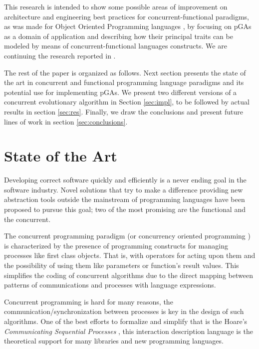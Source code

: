 \documentclass[sigconf]{acmart}
\begin{document}
This research is intended to show some possible areas of improvement on architecture and engineering best practices for concurrent-functional paradigms, as was made for Object Oriented Programming languages \cite{EO:FEA2000}, by focusing on pGAs as a domain of application and describing how their principal traits can be modeled by means of concurrent-functional languages constructs. We are continuing the research reported in \cite{DBLP:conf/gecco/CruzGGC13,J.Albert-Cruz2013}.

The rest of the paper is organized as follows. Next section presents the state of the art in concurrent and functional programming language paradigms and its potential use for implementing pGAs. We present two different versions of a concurrent evolutionary algorithm in Section \ref{sec:impl}, to be followed by actual results in section \ref{sec:res}. Finally, we draw the conclusions and present future lines of work in section \ref{sec:conclusions}.

\section{State of the Art}

\noindent Developing correct software quickly and efficiently is a
never ending goal in the software industry. Novel solutions that try
to make a difference providing new abstraction tools outside the
mainstream of programming languages have been proposed to pursue this
goal; two of the most promising are the functional and the concurrent.

The concurrent programming paradigm (or concurrency oriented
programming \cite{Armstrong2003}) is characterized by the presence of
programming constructs for managing processes like first class
objects. That is, with operators for acting upon them and the
possibility of using them like parameters or function's result
values. This simplifies the coding of concurrent algorithms due to the
direct mapping between patterns of communications and processes with
language expressions. 

Concurrent programming is hard for many reasons, the communication/synchronization between processes is key in the design of such algorithms. One of the best efforts to formalize and simplify that is the Hoare’s {\em Communicating Sequential Processes} \cite{Hoare:1978:CSP:359576.359585}, this interaction description language is the theoretical support for many libraries and new programming languages.
\end{document}
